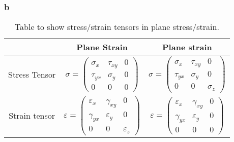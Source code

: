 \documentclass[11pt]{article}
\numberwithin{equation}{section}
\begin{document}
\subsubsection{b}
\begin{table}
    \begin{center}
        \begin{tabular}{ c c c }
            \toprule
                          & Plane Strain                              & Plane strain                              \\
            \midrule
            Stress Tensor & $\sigma = \begin{pmatrix}
                    \sigma_x  & \tau_{xy} & 0 \\
                    \tau_{yx} & \sigma_y  & 0 \\
                    0         & 0         & 0
                \end{pmatrix}$      & $\sigma = \begin{pmatrix}
                    \sigma_x  & \tau_{xy} & 0        \\
                    \tau_{yx} & \sigma_y  & 0        \\
                    0         & 0         & \sigma_z
                \end{pmatrix}$      \\
            Strain tensor & $\varepsilon = \begin{pmatrix}
                    \varepsilon_x & \gamma_{xy}   & 0             \\
                    \gamma_{yx}   & \varepsilon_y & 0             \\
                    0             & 0             & \varepsilon_z
                \end{pmatrix}$ & $\varepsilon = \begin{pmatrix}
                    \varepsilon_x & \gamma_{xy}   & 0 \\
                    \gamma_{yx}   & \varepsilon_y & 0 \\
                    0             & 0             & 0
                \end{pmatrix}$
        \end{tabular}
        \caption{Table to show stress/strain tensors in plane stress/strain.}
    \end{center}
\end{table}
\end{document}
